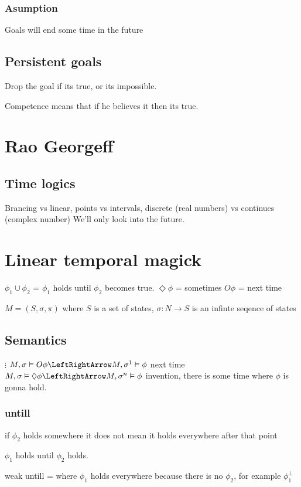 \documentclass{article}
\begin{document}
\subsubsection{Asumption}
Goals will end some time in the future

\subsection{Persistent goals}
Drop the goal if its true, or its impossible.

Competence means that if he believes it then its true.

\section{Rao Georgeff}
\subsection{Time logics}
Brancing vs linear, points vs intervals,
discrete (real numbers) vs continues (complex number)
We'll only look into the future.
\section{Linear temporal magick}

$\phi_1\cup\phi_2$ = $\phi_1$ holds until $\phi_2$ becomes true.
$\Diamond\phi$ = sometimes
$O\phi$ = next time

$M=(S,\sigma, \pi)$ where $S$ is a set of states, $\sigma: N \to S$ is an
infinte seqence of states

\subsection{Semantics}
$\vdots$
$M,\sigma\vDash O\phi \LeftRightArrow M, \sigma^1 \vDash \phi$ next time
$M,\sigma\vDash \Diamond\phi \LeftRightArrow M, \sigma^n \vDash \phi$
invention, there is some time where $\phi$ is gonna hold.

\subsubsection{untill}
if $\phi_2$ holds somewhere it does not mean it holds everywhere after that
point

$\phi_1$ holds until $\phi_2$ holds.

weak untill = where $\phi_1$ holds everywhere because there is no
$\phi_2$, for example $\phi_1^{\bot}$
\end{document}
